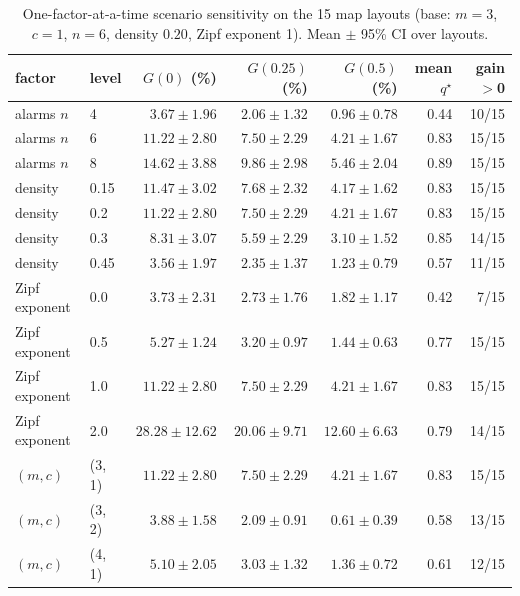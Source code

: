 \begin{table}[h]\centering\caption{One-factor-at-a-time scenario sensitivity on the 15 map layouts (base: $m=3$, $c=1$, $n=6$, density $0.20$, Zipf exponent 1). Mean $\pm$ 95\% CI over layouts.}\label{tab:s-sens}\scriptsize
\begin{tabular}{@{}llrrrrr@{}}\toprule factor & level & $G(0)$ (\%) & $G(0.25)$ (\%) & $G(0.5)$ (\%) & mean $q^\star$ & gain$>$0\\\midrule
alarms $n$ & 4 & $3.67\pm1.96$ & $2.06\pm1.32$ & $0.96\pm0.78$ & 0.44 & 10/15\\
alarms $n$ & 6 & $11.22\pm2.80$ & $7.50\pm2.29$ & $4.21\pm1.67$ & 0.83 & 15/15\\
alarms $n$ & 8 & $14.62\pm3.88$ & $9.86\pm2.98$ & $5.46\pm2.04$ & 0.89 & 15/15\\
density & 0.15 & $11.47\pm3.02$ & $7.68\pm2.32$ & $4.17\pm1.62$ & 0.83 & 15/15\\
density & 0.2 & $11.22\pm2.80$ & $7.50\pm2.29$ & $4.21\pm1.67$ & 0.83 & 15/15\\
density & 0.3 & $8.31\pm3.07$ & $5.59\pm2.29$ & $3.10\pm1.52$ & 0.85 & 14/15\\
density & 0.45 & $3.56\pm1.97$ & $2.35\pm1.37$ & $1.23\pm0.79$ & 0.57 & 11/15\\
Zipf exponent & 0.0 & $3.73\pm2.31$ & $2.73\pm1.76$ & $1.82\pm1.17$ & 0.42 & 7/15\\
Zipf exponent & 0.5 & $5.27\pm1.24$ & $3.20\pm0.97$ & $1.44\pm0.63$ & 0.77 & 15/15\\
Zipf exponent & 1.0 & $11.22\pm2.80$ & $7.50\pm2.29$ & $4.21\pm1.67$ & 0.83 & 15/15\\
Zipf exponent & 2.0 & $28.28\pm12.62$ & $20.06\pm9.71$ & $12.60\pm6.63$ & 0.79 & 14/15\\
$(m,c)$ & (3, 1) & $11.22\pm2.80$ & $7.50\pm2.29$ & $4.21\pm1.67$ & 0.83 & 15/15\\
$(m,c)$ & (3, 2) & $3.88\pm1.58$ & $2.09\pm0.91$ & $0.61\pm0.39$ & 0.58 & 13/15\\
$(m,c)$ & (4, 1) & $5.10\pm2.05$ & $3.03\pm1.32$ & $1.36\pm0.72$ & 0.61 & 12/15\\
\bottomrule\end{tabular}\end{table}
